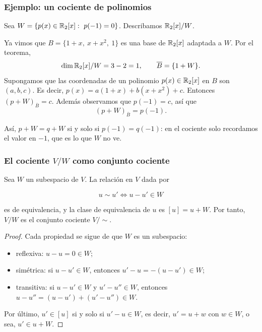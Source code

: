 \begin{frame}
    \frametitle{Ejemplo: un cociente de polinomios}

    \begin{example}
        Sea $W=\{p(x)\in\R_2[x]:\ p(-1)=0\}$. Describamos $\mathbb{R}_2[x]/W$.
    \end{example}

    Ya vimos que $B=\{1+x,\ x+x^2,\ 1\}$ es una base de $\mathbb{R}_2[x]$ adaptada
    a $W$. Por el teorema,
    \[
        \dim\mathbb{R}_2[x]/W=3-2=1,
        \qquad
        \overline{B}=\{1+W\}.
    \]
    Supongamos que las coordenadas de un polinomio $p(x)\in \mathbb{R}_2[x]$ en $B$ son $(a,b,c)$. Es decir, $p(x)=a(1+x)+b(x+x^2)+c$. Entonces $(p+W)_{\overline{B}}=c$. Además observamos que $p(-1)=c$, así que
    \[
        (p+W)_{\overline{B}}=p(-1).
    \]

    \medskip

    Así, $p+W=q+W$ si y solo si $p(-1)=q(-1)$: en el cociente solo
    \alert{recordamos el valor en $-1$}, que es lo que $W$ no ve.
\end{frame}


\begin{frame}
    \frametitle{El cociente $V/W$ como conjunto cociente}

    \begin{proposition}
        Sea $W$ un subespacio de $V$. La relación en $V$ dada por

        \vspace{-10pt}

        \[
            u\sim u'\iff u-u'\in W
        \]

        \vspace{-2pt}

        es de equivalencia, y la clase de equivalencia de $u$ es $[u]=u+W$.
        Por tanto, $V/W$ es el conjunto cociente $V/{\sim}$.
    \end{proposition}

    \vspace{-7pt}

    \begin{proof}
        Cada propiedad se sigue de que $W$ es un subespacio:
        \begin{itemize}
            \item reflexiva: $u-u=0\in W$;
            \item simétrica: si $u-u'\in W$, entonces $u'-u=-(u-u')\in W$;
            \item transitiva: si $u-u'\in W$ y $u'-u''\in W$, entonces
            $u-u''=(u-u')+(u'-u'')\in W$.
        \end{itemize}
        Por último, $u'\in[u]$ si y solo si $u'-u\in W$, es decir,
        $u'=u+w$ con $w\in W$, o sea, $u'\in u+W$.
    \end{proof}
\end{frame}
